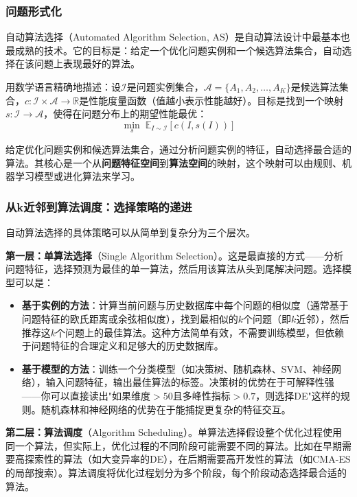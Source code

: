 \documentclass[lang=cn,zihao=-4,a4paper,fontset=windows]{beautybook}
\begin{document}
\subsubsection{问题形式化}

自动算法选择（Automated Algorithm Selection, AS）是自动算法设计中最基本也最成熟的技术。它的目标是：给定一个优化问题实例和一个候选算法集合，自动选择在该问题上表现最好的算法。

用数学语言精确地描述：设$\mathcal{I}$是问题实例集合，$\mathcal{A} = \{A_1, A_2, \dots, A_K\}$是候选算法集合，$c: \mathcal{I} \times \mathcal{A} \to \mathbb{R}$是性能度量函数（值越小表示性能越好）。目标是找到一个映射$s: \mathcal{I} \to \mathcal{A}$，使得在问题分布上的期望性能最优：
\[
\min_{s} \; \mathbb{E}_{I \sim \mathcal{I}} \left[ c(I, s(I)) \right]
\]

\begin{definition}
给定优化问题实例和候选算法集合，通过分析问题实例的特征，自动选择最合适的算法。其核心是一个从\textbf{问题特征空间}到\textbf{算法空间}的映射，这个映射可以由规则、机器学习模型或进化算法来学习。
\end{definition}

\subsubsection{从k近邻到算法调度：选择策略的递进}

自动算法选择的具体策略可以从简单到复杂分为三个层次。

\textbf{第一层：单算法选择}（Single Algorithm Selection）。这是最直接的方式——分析问题特征，选择预测为最佳的单一算法，然后用该算法从头到尾解决问题。选择模型可以是：
\begin{itemize}
    \item \textbf{基于实例的方法}：计算当前问题与历史数据库中每个问题的相似度（通常基于问题特征的欧氏距离或余弦相似度），找到最相似的$k$个问题（即$k$近邻），然后推荐这$k$个问题上的最佳算法。这种方法简单有效，不需要训练模型，但依赖于问题特征的合理定义和足够大的历史数据库。
    \item \textbf{基于模型的方法}：训练一个分类模型（如决策树、随机森林、SVM、神经网络），输入问题特征，输出最佳算法的标签。决策树的优势在于可解释性强——你可以直接读出"如果维度$>50$且多峰性指标$>0.7$，则选择DE"这样的规则。随机森林和神经网络的优势在于能捕捉更复杂的特征交互。
\end{itemize}

\textbf{第二层：算法调度}（Algorithm Scheduling）。单算法选择假设整个优化过程使用同一个算法，但实际上，优化过程的不同阶段可能需要不同的算法。比如在早期需要高探索性的算法（如大变异率的DE），在后期需要高开发性的算法（如CMA-ES的局部搜索）。算法调度将优化过程划分为多个阶段，每个阶段动态选择最合适的算法。
\end{document}
